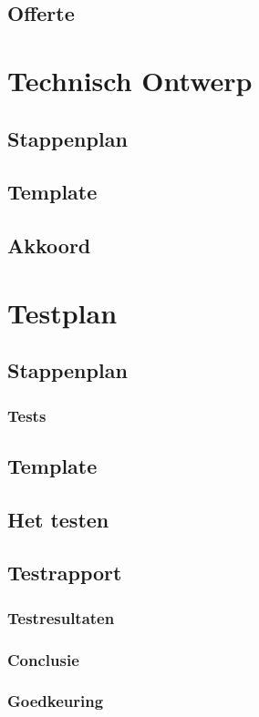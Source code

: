 \documentclass[a4paper,12pt,twoside,openright,titlepage]{book}
\begin{document}
\section{Offerte}


\chapter{Technisch Ontwerp}

\section{Stappenplan}

\section{Template}

\section{Akkoord}


\chapter{Testplan}

\section{Stappenplan}

\subsection{Tests}

\section{Template}

\section{Het testen}

\section{Testrapport}

\subsection{Testresultaten}

\subsection{Conclusie}

\subsection{Goedkeuring}


\backmatter
\printindex
\end{document}
